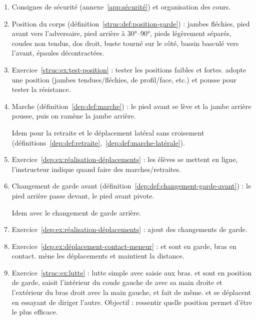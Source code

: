 \begin{enumerate}
	\item Consignes de sécurité (annexe~\ref{app:sécurité}) et organisation des cours.
	
	\item Position du corps (définition~\ref{struc:def:position-garde}) : jambes fléchies, pied avant vers l'adversaire, pied arrière à \ang{30}--\ang{90}, pieds légèrement séparés, coudes non tendus, dos droit, buste tourné sur le côté, bassin basculé vers l'avant, épaules décontractées.
	
	\item Exercice~\ref{struc:ex:test-position} : tester les positions faibles et fortes.
	\D adopte une position (jambes tendues/fléchies, de profil/face, etc.) et \A pousse pour tester la résistance.
	
	\item Marche (définition~\ref{dep:def:marche}) : le pied avant se lève et la jambe arrière pousse, puis on ramène la jambe arrière.
	
	Idem pour la retraite et le déplacement latéral sans croisement (définitions~\ref{dep:def:retraite},~\ref{dep:def:marche-latérale}).
	
	\item Exercice~\ref{dep:ex:réalisation-déplacements} : les élèves se mettent en ligne, l'instructeur indique quand faire des marches/retraites.
	
	\item Changement de garde avant (définition~\ref{dep:def:changement-garde-avant}) : le pied arrière passe devant, le pied avant pivote.
	
	Idem avec le changement de garde arrière.
	
	\item Exercice~\ref{dep:ex:réalisation-déplacements} : ajout des changements de garde.
	
	\item Exercice~\ref{dep:ex:déplacement-contact-meneur} : \A et \D sont en garde, bras en contact.
	\A mène les déplacements et \D maintient la distance.
	
	\item Exercice~\ref{struc:ex:lutte} : lutte simple avec saisie aux bras.
	\A et \D sont en position de garde, \A saisit l'intérieur du coude gauche de \D avec sa main droite et l'extérieur du bras droit avec la main gauche, et \D fait de même.
	\A et \D se déplacent en essayant de diriger l'autre.
	Objectif : ressentir quelle position permet d'être le plus efficace.
	

\end{enumerate}
